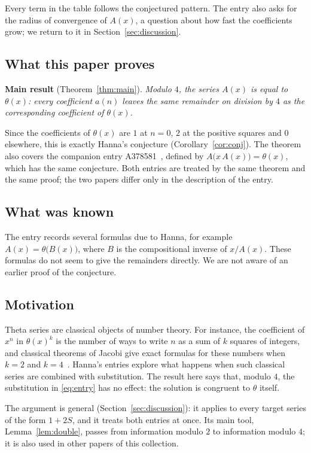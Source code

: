 \documentclass[11pt,a4paper]{article}
\theoremstyle{definition}
\theoremstyle{remark}
\begin{document}
Every term in the table follows the conjectured pattern. The entry also asks for the radius of
convergence of $A(x)$, a question about how fast the coefficients grow; we return to it in
Section~\ref{sec:discussion}.

\subsection{What this paper proves}
\textbf{Main result} (Theorem~\ref{thm:main}). \emph{Modulo $4$, the series $A(x)$ is equal to $\theta(x)$: every
coefficient $a(n)$ leaves the same remainder on division by $4$ as the corresponding coefficient of $\theta(x)$.}

Since the coefficients of $\theta(x)$ are $1$ at $n=0$, $2$ at the positive squares and $0$ elsewhere, this is exactly
Hanna's conjecture (Corollary~\ref{cor:conj}). The theorem also covers the companion entry A378581~\cite{oeisother},
defined by $A\bigl(x\,A(x)\bigr)=\theta(x)$, which has the same conjecture. Both entries are treated by the same theorem and
the same proof; the two papers differ only in the description of the entry.

\subsection{What was known}
The entry records several formulas due to Hanna, for example $A(x)=\theta\bigl(B(x)\bigr)$, where $B$ is the
compositional inverse of $x/A(x)$. These formulas do not seem to give the remainders directly. We are
not aware of an earlier proof of the conjecture.

\subsection{Motivation}
Theta series are classical objects of number theory. For instance, the coefficient of $x^n$ in
$\theta(x)^k$ is the number of ways to write $n$ as a sum of $k$ squares of integers, and classical theorems of Jacobi
give exact formulas for these numbers when $k=2$ and $k=4$~\cite{hardywright}. Hanna's entries explore what happens when
such classical series are combined with substitution. The result here says that, modulo $4$, the substitution in
\eqref{eq:entry} has no effect: the solution is congruent to $\theta$ itself.

The argument is general (Section~\ref{sec:discussion}): it applies to every target series of the form $1+2S$, and it
treats both entries at once. Its main tool, Lemma~\ref{lem:double}, passes from information modulo $2$ to information
modulo $4$; it is also used in other papers of this collection.
\end{document}
